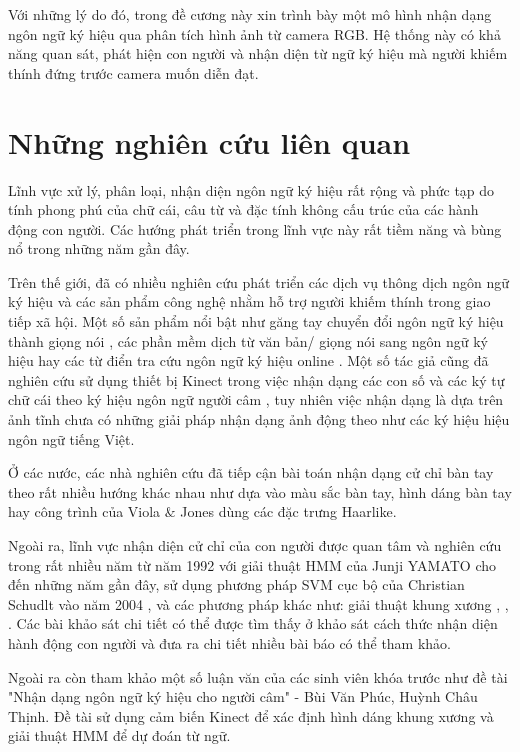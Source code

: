 Với những lý do đó, trong đề cương này xin trình bày một mô hình nhận dạng ngôn ngữ ký hiệu qua phân tích hình ảnh từ camera RGB. Hệ thống này có khả năng quan sát, phát hiện con người và nhận diện từ ngữ ký hiệu mà người khiếm thính đứng trước camera muốn diễn đạt. 

\section{Những nghiên cứu liên quan}
\label{ss:nghien_cuu_lien_quan}
Lĩnh vực xử lý, phân loại, nhận diện ngôn ngữ ký hiệu rất rộng và phức tạp do tính phong phú của chữ cái, câu từ và đặc tính không cấu trúc của các hành động con người. Các hướng phát triển trong lĩnh vực này rất tiềm năng và bùng nổ trong những năm gần đây.

Trên thế giới, đã có nhiều nghiên cứu phát triển các dịch vụ thông dịch ngôn ngữ ký hiệu và các sản phẩm công nghệ nhằm hỗ trợ người khiếm thính trong giao tiếp xã hội. Một số sản phẩm nổi bật như găng tay chuyển đổi ngôn ngữ ký hiệu thành giọng nói \cite{tl1}, các phần mềm dịch từ văn bản/ giọng nói sang ngôn ngữ ký hiệu hay các từ điển tra cứu ngôn ngữ ký hiệu online \cite{tl2}. Một số tác giả cũng đã nghiên cứu sử dụng thiết bị Kinect trong việc nhận dạng các con số và các ký tự chữ cái theo ký hiệu ngôn ngữ người câm \cite{tl3}, tuy nhiên việc nhận dạng là dựa trên ảnh tĩnh chưa có những giải pháp nhận dạng ảnh động theo như các ký hiệu hiệu ngôn ngữ tiếng Việt.

Ở các nước, các nhà nghiên cứu đã tiếp cận bài toán nhận dạng cử chỉ bàn tay theo rất nhiều hướng khác nhau như dựa vào màu sắc bàn tay, hình dáng bàn tay hay công trình của Viola $\&$ Jones dùng các đặc trưng Haarlike.

Ngoài ra, lĩnh vực nhận diện cử chỉ của con người được quan tâm và nghiên cứu trong rất nhiều năm từ năm 1992 \cite{Yamato} với giải thuật HMM của Junji YAMATO cho đến những năm gần đây, sử dụng phương pháp SVM cục bộ của Christian Schudlt vào năm 2004 \cite{Schuldt:2004:RHA:1018429.1020906}, và các phương pháp khác như: giải thuật khung xương \cite{Chen:2006:HAR:1178782.1178808}, \cite{Forsyth}, \cite{With}. Các bài khảo sát chi tiết có thể được tìm thấy ở \cite{Cristani201386} khảo sát cách thức nhận diện hành động con người và đưa ra chi tiết nhiều bài báo có thể tham khảo.

Ngoài ra còn tham khảo một số luận văn của các sinh viên khóa trước như đề tài "Nhận dạng ngôn ngữ ký hiệu cho người câm" - Bùi Văn Phúc, Huỳnh Châu Thịnh. Đề tài sử dụng cảm biến Kinect để xác định hình dáng khung xương và giải thuật HMM để dự đoán từ ngữ.

